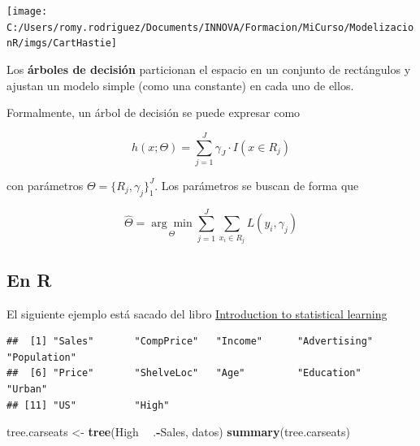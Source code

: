 \documentclass[]{book}
\newenvironment{Shaded}{\begin{snugshade}}{\end{snugshade}}
\newcommand{\DecValTok}[1]{\textcolor[rgb]{0.00,0.00,0.81}{#1}}
\newcommand{\KeywordTok}[1]{\textcolor[rgb]{0.13,0.29,0.53}{\textbf{#1}}}
\newcommand{\NormalTok}[1]{#1}
\newcommand{\OperatorTok}[1]{\textcolor[rgb]{0.81,0.36,0.00}{\textbf{#1}}}
\newcommand{\StringTok}[1]{\textcolor[rgb]{0.31,0.60,0.02}{#1}}
\begin{document}
\texttt{[image: C:/Users/romy.rodriguez/Documents/INNOVA/Formacion/MiCurso/ModelizacionR/imgs/CartHastie]}

Los \textbf{árboles de decisión} particionan el espacio en un conjunto de rectángulos y ajustan un modelo simple (como una constante) en cada uno de ellos.

Formalmente, un árbol de decisión se puede expresar como

\[h(x; \Theta) = \sum_{j=1}^J  \gamma_J \cdot I(x\in R_j)\]

con parámetros \(\Theta = \{ R_j, \gamma_j \}_1^J\). Los parámetros se buscan de forma que

\[\hat{\Theta} = \underset{\Theta}{\arg\min} \sum_{j=1}^J \sum_{x_i \in R_j} L(y_i, \gamma_j)\]

\hypertarget{en-r}{%
\subsection{En R}\label{en-r}}

El siguiente ejemplo está sacado del libro \href{http://www-bcf.usc.edu/~gareth/ISL/}{Introduction to statistical learning}

\begin{Shaded}
\end{Shaded}

\begin{verbatim}
##  [1] "Sales"       "CompPrice"   "Income"      "Advertising" "Population" 
##  [6] "Price"       "ShelveLoc"   "Age"         "Education"   "Urban"      
## [11] "US"          "High"
\end{verbatim}

\begin{Shaded}
\begin{Highlighting}[]
\NormalTok{tree.carseats <-}\StringTok{ }\KeywordTok{tree}\NormalTok{(High }\OperatorTok{~}\StringTok{ }\NormalTok{.}\OperatorTok{-}\NormalTok{Sales, datos)}
\KeywordTok{summary}\NormalTok{(tree.carseats)}
\end{Highlighting}
\end{Shaded}
\end{document}
